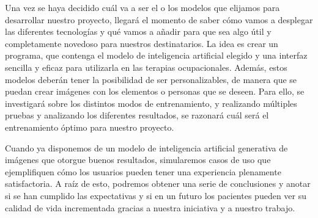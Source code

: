 Una vez se haya decidido cuál va a ser el o los modelos que elijamos para desarrollar nuestro proyecto, llegará el momento de saber cómo vamos a desplegar las diferentes tecnologías y qué vamos a añadir para que sea algo útil y completamente novedoso para nuestros destinatarios. La idea es crear un programa, que contenga el modelo de inteligencia artificial elegido y una interfaz sencilla y eficaz para utilizarla en las terapias ocupacionales. Además, estos modelos deberán tener la posibilidad de ser personalizables, de manera que se puedan crear imágenes con los elementos o personas que se deseen. Para ello, se investigará sobre los distintos modos de entrenamiento, y realizando múltiples pruebas y analizando los diferentes resultados, se razonará cuál será el entrenamiento óptimo para nuestro proyecto.

Cuando ya disponemos de un modelo de inteligencia artificial generativa de imágenes que otorgue buenos resultados, simularemos casos de uso que ejemplifiquen cómo los usuarios pueden tener una experiencia plenamente satisfactoria. A raíz de esto, podremos obtener una serie de conclusiones y anotar si se han cumplido las expectativas y si en un futuro los pacientes pueden ver su calidad de vida incrementada gracias a nuestra iniciativa y a nuestro trabajo.


